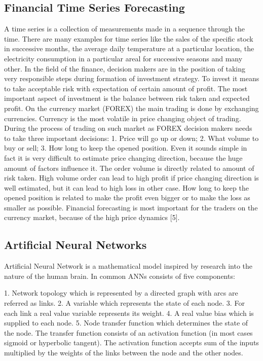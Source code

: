 \documentclass{llncs}
\begin{document}
\subsection{Financial Time Series Forecasting}
%
A time series is a collection of measurements made in a sequence through the time. There are many examples for time series like the sales of the specific stock in successive months, the average daily temperature at a particular location, the electricity consumption in a particular areal for successive seasons and many other. In the field of the finance, decision makers are in the position of taking very responsible steps during formation of investment strategy. To invest it means to take acceptable risk with expectation of certain amount of profit. The most important aspect of investment is the balance between risk taken and expected profit. On the currency market (FOREX) the main trading is done by exchanging currencies. Currency is the most volatile in price changing object of trading. During the process of trading on such market as FOREX decision makers needs to take three important decisions: 1. Price will go up or down; 2. What volume to buy or sell; 3. How long to keep the opened position. Even it sounds simple in fact it is very difficult to estimate price changing direction, because the huge amount of factors influence it. The order volume is directly related to amount of risk taken. High volume order can lead to high profit if price changing direction is well estimated, but it can lead to high loss in other case. How long to keep the opened position is related to make the profit even bigger or to make the loss as smaller as possible. Financial forecasting is most important for the traders on the currency market, because of the high price dynamics [5].
%
\subsection{Artificial Neural Networks}
%
Artificial Neural Network is a mathematical model inspired by research into the nature of the human brain. In common ANNs consists of five components: 

1. Network topology which is represented by a directed graph with arcs are referred as links.
2. A variable which represents the state of each node.
3. For each link a real value variable represents its weight.
4. A real value bias which is supplied to each node.
5. Node transfer function which determines the state of the node. The transfer function consists of an activation function (in most cases sigmoid or hyperbolic tangent). The activation function accepts sum of the inputs multiplied by the weights of the links between the node and the other nodes.
\end{document}
